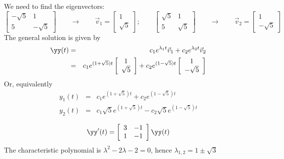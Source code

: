 We need to find the eigenvectors:
$$
\left[\begin{array}{cc}-\sqrt{5}&1\\5&-\sqrt{5}\end{array}\right]\qquad\rightarrow\qquad
\vec{v}_1=\left[\begin{array}{c}1\\\sqrt{5}\end{array}\right];\qquad
\left[\begin{array}{cc}\sqrt{5}&1\\5&\sqrt{5}\end{array}\right]\qquad\rightarrow\qquad
\vec{v}_2=\left[\begin{array}{c}1\\-\sqrt{5}\end{array}\right]
$$
The general solution is given by
\begin{eqnarray*}
\yy(t)&=&c_1e^{\lambda_1t}\vec{v}_1 + c_2e^{\lambda_2t}\vec{v}_2\\
&=&c_1e^{(1+\sqrt{5})t}\left[\begin{array}{c}1\\ \sqrt{5}\end{array}\right] + c_2e^{(1-\sqrt{5})t}\left[\begin{array}{c}1\\-\sqrt{5}\end{array}\right]
\end{eqnarray*}
Or, equivalently
\begin{eqnarray*}
y_1(t)&=&c_1e^{(1+\sqrt{5})t} + c_2e^{(1-\sqrt{5})t}\\
y_2(t)&=&c_1\sqrt{5}e^{(1+\sqrt{5})t} - c_2\sqrt{5} e^{(1-\sqrt{5})t}
\end{eqnarray*}

\vspace{2mm}
$$
\yy'(t)=\left[\begin{array}{cc}3&-1\\1&-1\end{array}\right]\yy(t)
$$
The characteristic polynomial is $\lambda^2-2\lambda-2=0$, hence $\lambda_{1,2}=1\pm\sqrt{3}$

